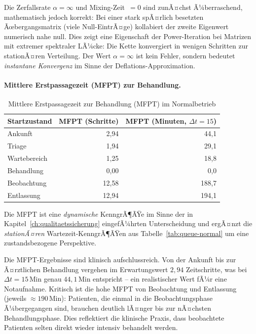 ﻿\documentclass[a4paper,12pt]{report}
\theoremstyle{definition}
\begin{document}
Die Zerfallsrate $\alpha = \infty$ und Mixing-Zeit~$= 0$ sind zunÃ¤chst
Ã¼berraschend, mathematisch jedoch korrekt: Bei einer stark spÃ¤rlich besetzten
Ãœbergangsmatrix (viele Null-EintrÃ¤ge) kollabiert der zweite Eigenwert
numerisch nahe null. Dies zeigt eine Eigenschaft der Power-Iteration bei
Matrizen mit extremer spektraler LÃ¼cke: Die Kette konvergiert in wenigen
Schritten zur stationÃ¤ren Verteilung. Der Wert
$\alpha = \infty$ ist kein Fehler, sondern bedeutet \emph{instantane
	Konvergenz} im Sinne der Deflations-Approximation.

\paragraph{Mittlere Erstpassagezeit (MFPT) zur Behandlung.}
\begin{table}[H]
	\centering
	\begin{tabular}{@{}lrr@{}}
		\toprule
		\textbf{Startzustand} & \textbf{MFPT (Schritte)} & \textbf{MFPT (Minuten, $\Delta t=15$)} \\
		\midrule
		Ankunft     & 2{,}94 & 44{,}1 \\
		Triage      & 1{,}94 & 29{,}1 \\
		Wartebereich& 1{,}25 & 18{,}8 \\
		Behandlung  & 0{,}00 &  0{,}0 \\
		Beobachtung &12{,}58 &188{,}7 \\
		Entlassung  &12{,}94 &194{,}1 \\
		\bottomrule
	\end{tabular}
	\caption{Mittlere Erstpassagezeit zur Behandlung (MFPT) im Normalbetrieb}
	\label{tab:mfpt-normal}
\end{table}

Die MFPT ist eine \emph{dynamische} KenngrÃ¶ÃŸe im Sinne der in Kapitel~\ref{ch:qualitaetssicherung} eingefÃ¼hrten Unterscheidung und ergÃ¤nzt die \emph{stationÃ¤ren} Wartezeit-KenngrÃ¶ÃŸen aus Tabelle~\ref{tab:queue-normal} um eine zustandsbezogene Perspektive.

Die MFPT-Ergebnisse sind klinisch aufschlussreich. Von der Ankunft bis zur
Ã¤rztlichen Behandlung vergehen im Erwartungswert $2{,}94$ Zeitschritte,
was bei $\Delta t = 15$\,Min genau $44{,}1$\,Min entspricht -- ein
realistischer Wert fÃ¼r eine Notaufnahme. Kritisch ist die hohe MFPT
von Beobachtung und Entlassung (jeweils $\approx 190$\,Min): Patienten,
die einmal in die Beobachtungsphase Ã¼bergegangen sind, brauchen
deutlich lÃ¤nger bis zur nÃ¤chsten Behandlungsphase. Dies reflektiert die
klinische Praxis, dass beobachtete Patienten selten direkt wieder intensiv
behandelt werden.
\end{document}
